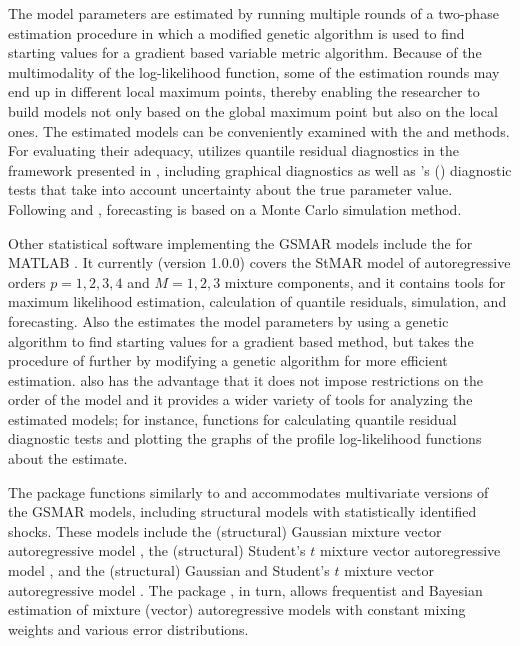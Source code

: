 \documentclass[nojss]{jss} %
\begin{document}
The model parameters are estimated by running multiple rounds of a two-phase estimation procedure in which a modified genetic algorithm is used to find starting values for a gradient based variable metric algorithm. Because of the multimodality of the log-likelihood function, some of the estimation rounds may end up in different local maximum points, thereby enabling the researcher to build models not only based on the global maximum point but also on the local ones. The estimated models can be conveniently examined with the  and  methods. For evaluating their adequacy,  utilizes quantile residual diagnostics in the framework presented in \cite{Kalliovirta:2012}, including graphical diagnostics as well as \citeauthor{Kalliovirta:2012}'s (\citeyear{Kalliovirta:2012}) diagnostic tests that take into account uncertainty about the true parameter value. Following \cite{Kalliovirta+Meitz+Saikkonen:2015} and \cite{Meitz+Preve+Saikkonen:2021}, forecasting is based on a Monte Carlo simulation method.

Other statistical software implementing the GSMAR models include the  for MATLAB \citep{Meitz+Preve+Saikkonen2:2018}. It currently (version 1.0.0) covers the StMAR model of autoregressive orders $p=1,2,3,4$ and $M=1,2,3$ mixture components, and it contains tools for maximum likelihood estimation, calculation of quantile residuals, simulation, and forecasting. Also the  estimates the model parameters by using a genetic algorithm to find starting values for a gradient based method, but  takes the procedure of \cite{Meitz+Preve+Saikkonen2:2018, Meitz+Preve+Saikkonen:2021} further by modifying a genetic algorithm for more efficient estimation.  also has the advantage that it does not impose restrictions on the order of the model and it provides a wider variety of tools for analyzing the estimated models; for instance, functions for calculating quantile residual diagnostic tests \citep{Kalliovirta:2012} and plotting the graphs of the profile log-likelihood functions about the estimate.

The  package  \citep{Virolainen:2018} functions similarly to  and accommodates multivariate versions of the GSMAR models, including structural models with statistically identified shocks. These models include the (structural) Gaussian mixture vector autoregressive model \citep{Kalliovirta+Meitz+Saikkonen:2016, Virolainen:2021}, the (structural) Student's $t$ mixture vector autoregressive model \citep{Virolainen2:2021}, and the (structural) Gaussian and Student's $t$ mixture vector autoregressive model \citep{Virolainen2:2021}. The  package  \citep{Boshnakov+Ravagli:2021}, in turn, allows frequentist and Bayesian estimation of mixture (vector) autoregressive models with constant mixing weights \citep[e.g.,][]{Wong+Li:2000, Fong+Li+Yau+Wong:2007} and various error distributions.
\end{document}
